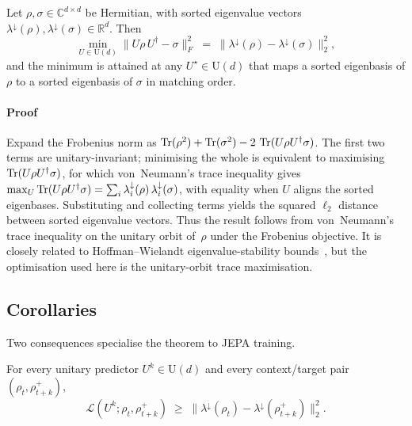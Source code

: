 \begin{theorem}\label{thm:spectrum-mm}
Let $\rho, \sigma \in \mathbb{C}^{d \times d}$ be Hermitian, with sorted
eigenvalue vectors $\lambda^{\downarrow}(\rho), \lambda^{\downarrow}(\sigma)
\in \mathbb{R}^{d}$. Then
\begin{equation}\label{eq:spectrum-mm-main}
  \min_{U \in \mathrm{U}(d)}
  \bigl\lVert U \rho\, U^{\dagger} - \sigma \bigr\rVert_{F}^{2}
  \;=\;
  \bigl\lVert \lambda^{\downarrow}(\rho)
             - \lambda^{\downarrow}(\sigma) \bigr\rVert_{2}^{2},
\end{equation}
and the minimum is attained at any $U^{\star} \in \mathrm{U}(d)$ that maps a
sorted eigenbasis of $\rho$ to a sorted eigenbasis of $\sigma$ in matching
order.
\end{theorem}

\paragraph{Proof} Expand the Frobenius norm as
$\operatorname{Tr}(\rho^{2}) + \operatorname{Tr}(\sigma^{2}) - 2\,\operatorname{Tr}(U \rho U^{\dagger} \sigma)$. The
first two terms are unitary-invariant; minimising the whole is equivalent to
maximising $\operatorname{Tr}(U \rho U^{\dagger} \sigma)$, for which von~Neumann's trace
inequality gives
$\max_{U}\operatorname{Tr}(U\rho U^{\dagger}\sigma) = \sum_{i}\lambda_{i}^{\downarrow}(\rho)\,
\lambda_{i}^{\downarrow}(\sigma)$, with equality when $U$ aligns the sorted
eigenbases. Substituting and collecting terms yields the squared $\ell_{2}$
distance between sorted eigenvalue vectors. Thus the result follows from
von~Neumann's trace inequality on the unitary orbit of~$\rho$ under the
Frobenius objective. It is closely related to Hoffman--Wielandt
eigenvalue-stability bounds~\cite{hoffman1953variation}, but the
optimisation used here is the unitary-orbit trace maximisation.

\subsection{Corollaries}\label{sec:theorem-corollaries}

Two consequences specialise the theorem to JEPA training.

\begin{corollary}\label{cor:irreducible}
For every unitary predictor $U^{k} \in \mathrm{U}(d)$ and every context/target
pair $(\rho_{t}, \rho_{t+k}^{+})$,
\begin{equation}\label{eq:cor-irreducible}
  \mathcal{L}(U^{k}; \rho_{t}, \rho_{t+k}^{+})
  \;\geq\;
  \bigl\lVert \lambda^{\downarrow}(\rho_{t})
             - \lambda^{\downarrow}(\rho_{t+k}^{+}) \bigr\rVert_{2}^{2}.
\end{equation}
\end{corollary}

